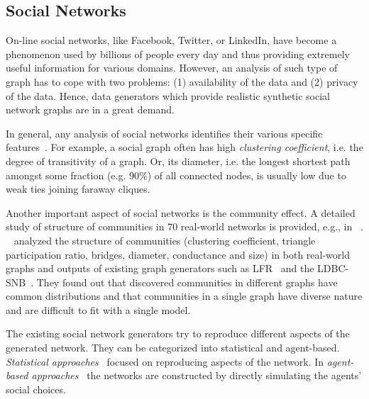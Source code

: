 \subsection{Social Networks}
\label{sec:generators_socialnetworks}

On-line social networks, like Facebook, Twitter, or LinkedIn, have become a
phenomenon used by billions of people every day and thus providing extremely
useful information for various domains. However, an analysis of such type of
graph has to cope with two problems: (1) availability of the data and (2)
privacy of the data. Hence, data generators which provide realistic synthetic
social network graphs are in a great demand.

In general, any analysis of social networks identifies their various specific
features~\cite{Chakrabarti:2006:GML:1132952.1132954}. For example, a social
graph often has high \emph{clustering coefficient}, i.e. the degree of
transitivity of a graph. Or, its diameter, i.e. the longest shortest path
amongst some fraction (e.g. 90\%) of all connected nodes, is usually low due to
weak ties joining faraway cliques.

Another important aspect of social networks is the community effect. A detailed
study of structure of communities in 70 real-world networks is provided, e.g.,
in ~\cite{Leskovec:2008:SPC:1367497.1367591}.
~\cite{Prat-Perez:2014:CSS:2621934.2621942} analyzed the structure of
communities (clustering coefficient, triangle participation ratio, bridges,
diameter, conductance and size) in both real-world graphs and outputs of
existing graph generators such as LFR~\cite{PhysRevE.78.046110} and the
LDBC-SNB~\cite{Erling:2015:LSN:2723372.2742786}. They found out that discovered
communities  in different graphs have common distributions and that communities
in a single graph have diverse nature and are difficult to fit with a single
model.

The existing social network generators try to reproduce different aspects of the
generated network. They can be categorized into statistical and agent-based.
\emph{Statistical
approaches}~\cite{PhysRevE.78.046110,Yao2011,Armstrong:2013:LDB:2463676.2465296,Pham2013,Sukthankar-SocialInfo2014,Erling:2015:LSN:2723372.2742786,Nettleton2016}
focused on reproducing aspects of the network. In \emph{agent-based
approaches}~\cite{Barrett:2009:GAL:1995456.1995598,Bernstein:2013:SAS:2499604.2499609}
the networks are constructed by directly simulating the agents' social choices.


